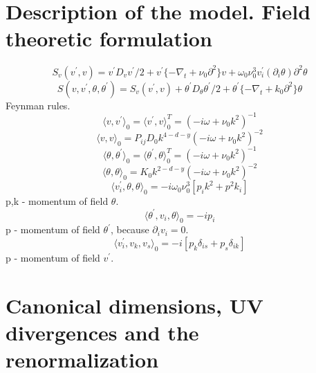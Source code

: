 \documentclass[12pt]{article}
\begin{document}

\section{Description of the model. Field theoretic formulation}
\label{sec:QFT}
\begin{equation}
    S_{v}(v^{'},v)=v^{'}D_{v}v^{'}/2+v^{'}\{-\nabla_{t}+\nu_{0}\partial^2\}v+\omega_{0}\nu_{0}^{3}v^{'}_{i}(\partial_{i}\theta)\partial^{2}\theta
\end{equation}
\begin{equation}
S(v,v^{'},\theta,\theta^{'}) = S_{v}(v^{'},v)+\theta^{'}D_{\theta}\theta^{'}/2+\theta^{'}\{-\nabla_{t}+k_{0}\partial^{2}\}\theta
\end{equation}
Feynman rules.
\begin{equation}
\langle v,v^{'} \rangle_{0}=\langle v^{'},v \rangle _{0}^{T}=(-i\omega+\nu_{0}k^2)^{-1}
\end{equation}
\begin{equation}
\langle v,v \rangle_{0}=P_{ij}D_{0}k^{4-d-y}(-i\omega+\nu_{0}k^2)^{-2}
\end{equation}
\begin{equation}
\langle \theta,\theta^{'} \rangle_{0}=\langle \theta^{'},\theta \rangle _{0}^{T}=(-i\omega+\nu_{0}k^2)^{-1}
\end{equation}
\begin{equation}
\langle \theta,\theta \rangle_{0}=K_{0}k^{2-d-y}(-i\omega+\nu_{0}k^2)^{-2}
\end{equation}
\begin{equation}
    \langle v_{i}^{'}, \theta,\theta \rangle_{0}= -i\omega_{0}\nu_{0}^{3}[p_i k^2+p^2 k_i]
\end{equation}
p,k - momentum of field $\theta$.
\begin{equation}
\langle \theta^{'}, v_i ,\theta \rangle_{0}= -ip_i
\end{equation}
p - momentum of field $\theta^{'}$, because $\partial_i v_i=0$.
\begin{equation}
\langle v^{'}_i, v_k ,v_s \rangle_{0}= -i[p_k \delta_{is}+ p_s \delta_{ik}]
\end{equation}
p - momentum of field $v^{'}$.
\section{Canonical dimensions, UV divergences and the renormalization}
\label{sec:Reno}
\end{document}
